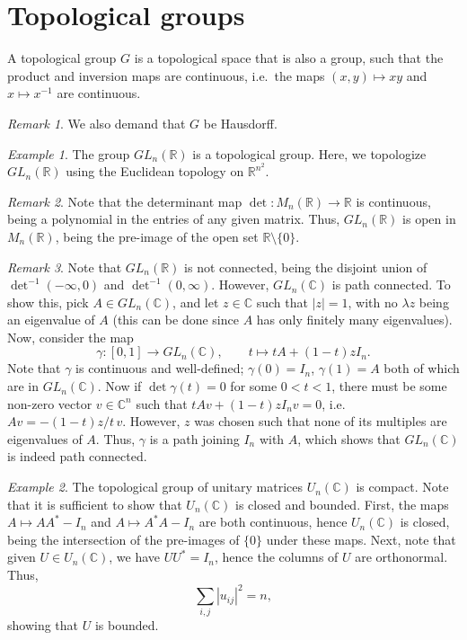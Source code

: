 \documentclass[11pt]{article}
\newcommand{\C}{\mathbb{C}}
\newcommand{\R}{\mathbb{R}}
\theoremstyle{definition}
\theoremstyle{remark}
\newtheorem*{remark}{Remark}
\newtheorem*{example}{Example}
\numberwithin{equation}{section}
\begin{document}
    \section{Topological groups}

    \begin{definition}
        A topological group $G$ is a topological space that is also a group, such
        that the product and inversion maps are continuous, i.e.\ the maps $(x,
        y) \mapsto xy$ and $x \mapsto x^{-1}$ are continuous.
        \begin{remark}
            We also demand that $G$ be Hausdorff.
        \end{remark}
    \end{definition}
    \begin{example}
        The group $GL_n(\R)$ is a topological group. Here, we topologize $GL_n(\R)$
        using the Euclidean topology on $\R^{n^2}$. 
        \begin{remark}
            Note that the determinant map $\det\colon M_n(\R) \to \R$ is continuous,
            being a polynomial in the entries of any given matrix. Thus, $GL_n(\R)$
            is open in $M_n(\R)$, being the pre-image of the open set
            $\R\setminus\{0\}$.
        \end{remark}
        \begin{remark}
            Note that $GL_n(\R)$ is not connected, being the disjoint union of
            $\det^{-1}(-\infty, 0)$ and $\det^{-1}(0, \infty)$. However, $GL_n(\C)$
            is path connected. To show this, pick $A \in GL_n(\C)$, and let $z \in
            \C$ such that $|z| = 1$, with no $\lambda z$ being an eigenvalue of $A$
            (this can be done since $A$ has only finitely many eigenvalues). Now,
            consider the map \[
                \gamma\colon [0, 1] \to GL_n(\C), \qquad t \mapsto tA + (1 - t)zI_n.
            \] Note that $\gamma$ is continuous and well-defined; $\gamma(0) = I_n$,
            $\gamma(1) = A$ both of which are in $GL_n(\C)$. Now if $\det\gamma(t) =
            0$ for some $0 < t < 1$, there must be some non-zero vector $v\in \C^n$
            such that $tAv + (1 - t)zI_nv = 0$, i.e.\ $Av = -(1 - t)z/t\,v$. However,
            $z$ was chosen such that none of its multiples are eigenvalues of $A$.
            Thus, $\gamma$ is a path joining $I_n$ with $A$, which shows that
            $GL_n(\C)$ is indeed path connected.
        \end{remark}
    \end{example}
    \begin{example}
        The topological group of unitary matrices $U_n(\C)$ is compact. Note that it
        is sufficient to show that $U_n(\C)$ is closed and bounded. First, the maps
        $A \mapsto A A^* - I_n$ and $A \mapsto A^* A - I_n$ are both continuous,
        hence $U_n(\C)$ is closed, being the intersection of the pre-images of
        $\{0\}$ under these maps. Next, note that given $U \in U_n(\C)$, we have $U
        U^* = I_n$, hence the columns of $U$ are orthonormal. Thus, \[
            \sum_{i, j} |u_{ij}|^2 = n,
        \] showing that $U$ is bounded.
    \end{example}
\end{document}
